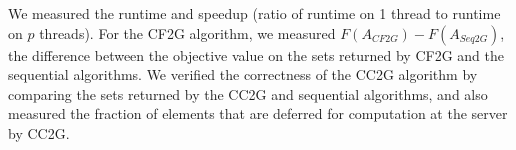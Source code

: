 \documentclass{article} %
\newcommand{\hogwild}{CF2G}
\newcommand{\occ}{CC2G}
\newcommand{\seqalg}{Seq2G}
\begin{document}
We measured the runtime and speedup (ratio of runtime on 1 thread to runtime on $p$ threads).
For the \hogwild{} algorithm, we measured $F(A_{\hogwild})-F(A_{\seqalg})$, the difference between the objective value on the sets returned by \hogwild{} and the sequential algorithms.
We verified the correctness of the \occ{} algorithm by comparing the sets returned by the \occ{} and sequential algorithms, and also measured the fraction of elements that are deferred for computation at the server by \occ{}.

\end{document}
